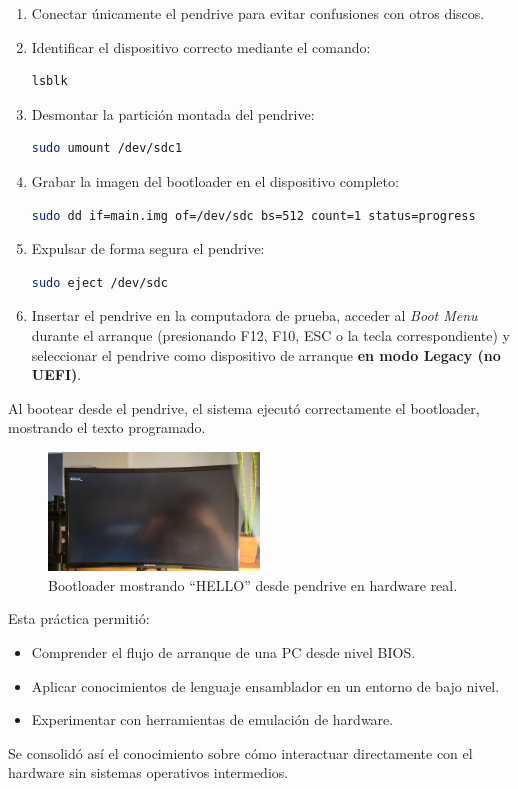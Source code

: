 \begin{enumerate}
    \item Conectar únicamente el pendrive para evitar confusiones con otros discos.
    \item Identificar el dispositivo correcto mediante el comando:
    \begin{lstlisting}[language=bash]
lsblk
    \end{lstlisting}
    \item Desmontar la partición montada del pendrive:
    \begin{lstlisting}[language=bash]
sudo umount /dev/sdc1
    \end{lstlisting}
    \item Grabar la imagen del bootloader en el dispositivo completo:
    \begin{lstlisting}[language=bash]
sudo dd if=main.img of=/dev/sdc bs=512 count=1 status=progress
    \end{lstlisting}
    \item Expulsar de forma segura el pendrive:
    \begin{lstlisting}[language=bash]
sudo eject /dev/sdc
    \end{lstlisting}
    \item Insertar el pendrive en la computadora de prueba, acceder al \textit{Boot Menu} durante el arranque (presionando F12, F10, ESC o la tecla correspondiente) y seleccionar el pendrive como dispositivo de arranque \textbf{en modo Legacy (no UEFI)}.
\end{enumerate}

Al bootear desde el pendrive, el sistema ejecutó correctamente el bootloader, mostrando el texto programado.

\begin{figure}[H]
    \centering
    \includegraphics[width=0.5\textwidth]{images/bootloader_pendrive.jpeg}
    \caption{Bootloader mostrando ``HELLO'' desde pendrive en hardware real.}
\end{figure}

Esta práctica permitió:
\begin{itemize}
    \item Comprender el flujo de arranque de una PC desde nivel BIOS.
    \item Aplicar conocimientos de lenguaje ensamblador en un entorno de bajo nivel.
    \item Experimentar con herramientas de emulación de hardware.
\end{itemize}

Se consolidó así el conocimiento sobre cómo interactuar directamente con el hardware sin sistemas operativos intermedios.
